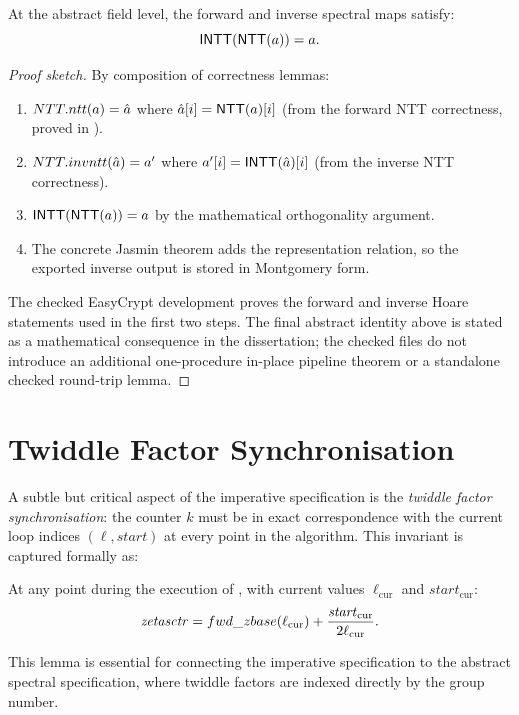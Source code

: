 \begin{proposition}
  At the abstract field level, the forward and inverse spectral maps satisfy:
  \[
    \mathsf{INTT}(\mathsf{NTT}(a)) = a.
  \]
\label{thm:imp_roundtrip}
\end{proposition}

\begin{proof}[Proof sketch]
  By composition of correctness lemmas:
  \begin{enumerate}
    \item $NTT.ntt(a) = \hat{a}$ where $\hat{a}[i] = \mathsf{NTT}(a)[i]$
          (from the forward NTT correctness, proved in ).
    \item $NTT.invntt(\hat{a}) = a'$ where
          $a'[i] = \mathsf{INTT}(\hat{a})[i]$
          (from the inverse NTT correctness).
    \item $\mathsf{INTT}(\mathsf{NTT}(a)) = a$ by the mathematical orthogonality argument.
    \item The concrete Jasmin theorem adds the 
          representation relation, so the exported inverse output is stored
          in Montgomery form.
  \end{enumerate}
  The checked EasyCrypt development proves the forward and inverse Hoare
  statements used in the first two steps.  The final abstract identity above
  is stated as a mathematical consequence in the dissertation; the checked
  files do not introduce an additional one-procedure in-place pipeline theorem
  or a standalone checked round-trip lemma.
\end{proof}

\section{Twiddle Factor Synchronisation}

A subtle but critical aspect of the imperative specification is the
\emph{twiddle factor synchronisation}: the counter $k$ must be in exact
correspondence with the current loop indices $(\ell, \mathit{start})$ at every
point in the algorithm.  This invariant is captured formally as:

\begin{lemma}
  At any point during the execution of , with current values
  $\ell_{\mathrm{cur}}$ and $\mathit{start}_{\mathrm{cur}}$:
  \[
    \mathit{zetasctr} =
      fwd\_zbase(\ell_{\mathrm{cur}}) +
      \frac{\mathit{start}_{\mathrm{cur}}}{2\ell_{\mathrm{cur}}}.
  \]
\label{lem:twiddle_sync}
\end{lemma}

This lemma is essential for connecting the imperative specification to the
abstract spectral specification, where twiddle factors are indexed directly
by the group number.
